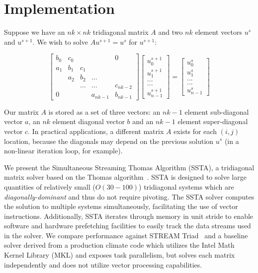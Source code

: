 \documentclass{sig-alternate-05-2015}
\begin{document}
\section{Implementation}
\label{sec:implementation}

Suppose we have an \(nk \times nk\) tridiagonal matrix \(A\) and two \(nk\) element
  vectors \(u^{s}\) and \(u^{s+1}\).  We wish to solve \(Au^{s+1} = u^{s}\) for
  \(u^{s+1}\):

\[
\begin{bmatrix}
b_0 & c_0 &     &          & 0        \\
a_1 & b_1 & c_1 &          &          \\
    & a_2 & b_2 & ...      &          \\
    &     & ... & ...      & c_{nk-2} \\
0   &     &     & a_{nk-1} & b_{nk-1}
\end{bmatrix}
\begin{bmatrix}
u^{s+1}_0     \\
u^{s+1}_1     \\
...     \\
...     \\
u^{s+1}_{n-1}
\end{bmatrix}
=
\begin{bmatrix}
u^{s}_0     \\
u^{s}_1     \\
...     \\
...     \\
u^{s}_{n-1}
\end{bmatrix}
\]

Our matrix \(A\) is stored as a set of three vectors: an \(nk-1\) element
  sub-diagonal vector \(a\), an \(nk\) element diagonal vector \(b\) and an
  \(nk-1\) element super-diagonal vector \(c\).
In practical applications, a different matrix \(A\) exists for each \((i,j)\)
  location, because the diagonals may depend on the previous solution \(u^{s}\)
  (in a non-linear iteration loop, for example).

We present the Simultaneous Streaming Thomas Algorithm (SSTA), a tridiagonal
  matrix solver based on the Thomas
  algorithm~\cite{ConteEtAlElementaryNumericalAnalysis,QuarteroniEtAl2007,TDMA}.
SSTA is designed to solve large quantities of relatively small (\(O(30-100)\))
  tridiagonal systems which are \emph{diagonally-dominant} and thus do not require
  pivoting.
The SSTA solver computes the solution to multiple systems simultaneously, facilitating
  the use of vector instructions.
Additionally, SSTA iterates through memory in unit stride to enable software and 
  hardware prefetching facilities to easily track the data streams used in the solver.
We compare performance against STREAM Triad~\cite{stream} and a baseline solver
  derived from a production climate code which utilizes the Intel Math Kernel
  Library (MKL) and exposes task parallelism, but solves each matrix
  independently and does not utilize vector processing capabilities.
\end{document}
